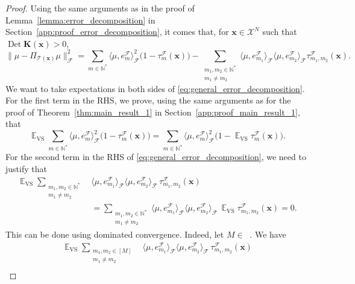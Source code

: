 \documentclass[twoside,11pt]{book}
\numberwithin{theorem}{chapter}
\numberwithin{definition}{chapter}
\numberwithin{proposition}{chapter}
\numberwithin{corollary}{chapter}
\numberwithin{example}{chapter}
\numberwithin{lemma}{chapter}
\DeclareMathOperator{\Det}{Det}
\DeclareMathOperator{\VS}{\mathrm{VS}}
\DeclareMathOperator{\EX}{\mathbb{E}}
\DeclareMathOperator{\F}{\mathcal{F}}
\DeclareMathOperator{\Ns}{\mathbb{N}^{*}}
\begin{document}
\begin{proof}
Using the same arguments as in the proof of Lemma~\ref{lemma:error_decomposition} in Section~\ref{app:proof_error_decomposition}, it comes that,
for $\bm{x} \in \mathcal{X}^{N}$ such that $\Det \bm{K}(\bm{x}) > 0$,
\begin{equation}\label{eq:general_error_decomposition}
\|\mu - \Pi_{\mathcal{T}(\bm{x})} \mu\|_{\F}^{2}  = \sum\limits_{m \in \mathbb{N}^{*}} \langle \mu, e_{m}^{\F} \rangle_{\F}^{2}\bigg(1- \tau_{m}^{\F}(\bm{x})\bigg) - \sum\limits_{\substack{m_{1},m_{2} \in \mathbb{N}^{*} \\ m_{1} \neq m_{2}}}  \langle \mu, e_{m_{1}}^{\F} \rangle_{\F} \langle \mu, e_{m_{2}}^{\F} \rangle_{\F} \tau_{m_{1},m_{2}}^{\F}(\bm{x}).
\end{equation}
We want to take expectations in both sides of \eqref{eq:general_error_decomposition}. For the first term in the RHS, we prove, using the same arguments as for the proof of Theorem~\ref{thm:main_result_1} in Section~\ref{app:proof_main_result_1}, that
\begin{equation}\label{eq:EX_VS_lvs_interpolation}
\EX_{\VS} \sum\limits_{m \in \mathbb{N}^{*}} \langle \mu, e_{m}^{\F} \rangle_{\F}^{2}\bigg(1- \tau_{m}^{\F}(\bm{x})\bigg) = \sum\limits_{m \in \mathbb{N}^{*}} \langle \mu, e_{m}^{\F} \rangle_{\F}^{2}\bigg(1- \EX_{\VS}\tau_{m}^{\F}(\bm{x})\bigg).
\end{equation}
For the second term in the RHS of \eqref{eq:general_error_decomposition}, we need to justify that
\begin{align}
\EX_{\VS} \sum\limits_{\substack{m_{1},m_{2} \in \mathbb{N}^{*} \\ m_{1} \neq m_{2}}}  &\langle \mu, e_{m_{1}}^{\F} \rangle_{\F} \langle \mu, e_{m_{2}}^{\F} \rangle_{\F} \, \tau_{m_{1},m_{2}}^{\F}(\bm{x}) \nonumber\\
& = \sum\limits_{\substack{m_{1},m_{2} \in \mathbb{N}^{*} \\ m_{1} \neq m_{2}}}  \langle \mu, e_{m_{1}}^{\F} \rangle_{\F} \langle \mu, e_{m_{2}}^{\F} \rangle_{\F} \,\EX_{\VS}\tau_{m_{1},m_{2}}^{\F}(\bm{x}) = 0.
\label{eq:EX_VS_cross_lvs_interpolation}
\end{align}
This can be done using dominated convergence. Indeed, let $M \in \Ns$. We have
\begin{align}
\EX_{\VS} \sum\limits_{\substack{m_{1},m_{2} \in [M] \\ m_{1} \neq m_{2}}}  &\langle \mu, e_{m_{1}}^{\F} \rangle_{\F} \langle \mu, e_{m_{2}}^{\F} \rangle_{\F} \,\tau_{m_{1},m_{2}}^{\F}(\bm{x}) \nonumber\\

\end{align}
\end{proof}
\end{document}
